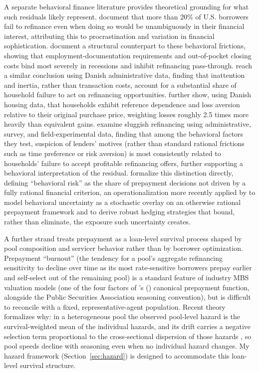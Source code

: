 \documentclass[12pt]{article}
\newcommand{\citepos}[1]{\citeauthor{#1}'s (\citeyear{#1})}
\begin{document}
A separate behavioral finance literature provides theoretical grounding for what such residuals likely represent. \citet{keys2016} document that more than 20\% of U.S. borrowers fail to refinance even when doing so would be unambiguously in their financial interest, attributing this to procrastination and variation in financial sophistication. \citet{defusco2020} document a structural counterpart to these behavioral frictions, showing that employment-documentation requirements and out-of-pocket closing costs bind most severely in recessions and inhibit refinancing pass-through. \citet{andersen2020} reach a similar conclusion using Danish administrative data, finding that inattention and inertia, rather than transaction costs, account for a substantial share of household failure to act on refinancing opportunities. \citet{andersen2022} further show, using Danish housing data, that households exhibit reference dependence and loss aversion relative to their original purchase price, weighting losses roughly 2.5 times more heavily than equivalent gains. \citet{johnson2019} examine sluggish refinancing using administrative, survey, and field-experimental data, finding that among the behavioral factors they test, suspicion of lenders' motives (rather than standard rational frictions such as time preference or risk aversion) is most consistently related to households' failure to accept profitable refinancing offers, further supporting a behavioral interpretation of the residual. \citet{bissiri2014} formalize this distinction directly, defining ``behavioral risk'' as the share of prepayment decisions not driven by a fully rational financial criterion, an operationalization more recently applied by \citet{perotti2024} to model behavioral uncertainty as a stochastic overlay on an otherwise rational prepayment framework and to derive robust hedging strategies that bound, rather than eliminate, the exposure such uncertainty creates.

A further strand treats prepayment as a loan-level survival process shaped by pool composition and servicer behavior rather than by borrower optimization. Prepayment ``burnout'' (the tendency for a pool's aggregate refinancing sensitivity to decline over time as its most rate-sensitive borrowers prepay earlier and self-select out of the remaining pool) is a standard feature of industry MBS valuation models (one of the four factors of \citepos{richard1989} canonical prepayment function, alongside the Public Securities Association seasoning convention), but is difficult to reconcile with a fixed, representative-agent population. Recent theory formalizes why: in a heterogeneous pool the observed pool-level hazard is the survival-weighted mean of the individual hazards, and its drift carries a negative selection term proportional to the cross-sectional dispersion of those hazards \citep{lesniewski2026}, so pool speeds decline with seasoning even when no individual hazard changes. My hazard framework (Section~\ref{sec:hazard}) is designed to accommodate this loan-level survival structure.
\end{document}
